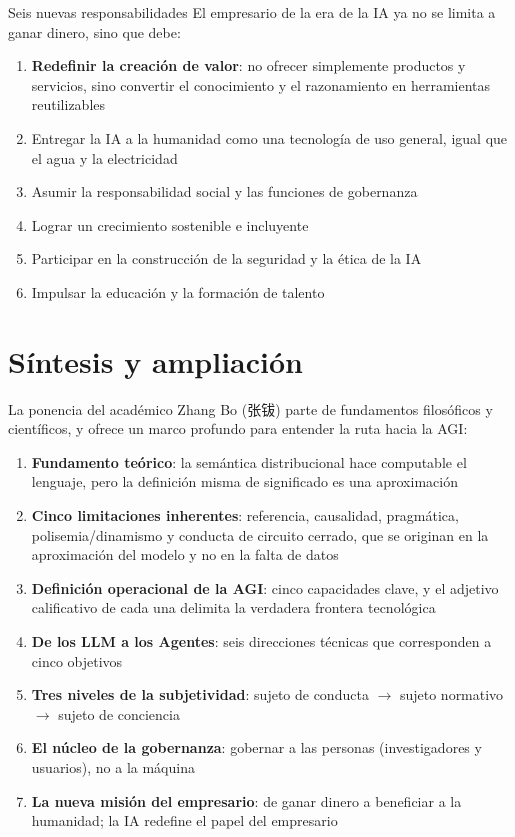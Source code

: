 \documentclass[a4paper]{article}
\begin{document}
\begin{importantbox}{Seis nuevas responsabilidades}
El empresario de la era de la IA ya no se limita a ganar dinero, sino que debe:
\begin{enumerate}
\item \textbf{Redefinir la creación de valor}: no ofrecer simplemente productos y servicios, sino convertir el conocimiento y el razonamiento en herramientas reutilizables
\item Entregar la IA a la humanidad como una tecnología de uso general, igual que el agua y la electricidad
\item Asumir la responsabilidad social y las funciones de gobernanza
\item Lograr un crecimiento sostenible e incluyente
\item Participar en la construcción de la seguridad y la ética de la IA
\item Impulsar la educación y la formación de talento
\end{enumerate}
\end{importantbox}

\section{Síntesis y ampliación}

La ponencia del académico Zhang Bo (张钹) parte de fundamentos filosóficos y científicos, y ofrece un marco profundo para entender la ruta hacia la AGI:

\begin{enumerate}
\item \textbf{Fundamento teórico}: la semántica distribucional hace computable el lenguaje, pero la definición misma de significado es una aproximación
\item \textbf{Cinco limitaciones inherentes}: referencia, causalidad, pragmática, polisemia/dinamismo y conducta de circuito cerrado, que se originan en la aproximación del modelo y no en la falta de datos
\item \textbf{Definición operacional de la AGI}: cinco capacidades clave, y el adjetivo calificativo de cada una delimita la verdadera frontera tecnológica
\item \textbf{De los LLM a los Agentes}: seis direcciones técnicas que corresponden a cinco objetivos
\item \textbf{Tres niveles de la subjetividad}: sujeto de conducta $\rightarrow$ sujeto normativo $\rightarrow$ sujeto de conciencia
\item \textbf{El núcleo de la gobernanza}: gobernar a las personas (investigadores y usuarios), no a la máquina
\item \textbf{La nueva misión del empresario}: de ganar dinero a beneficiar a la humanidad; la IA redefine el papel del empresario
\end{enumerate}
\end{document}
